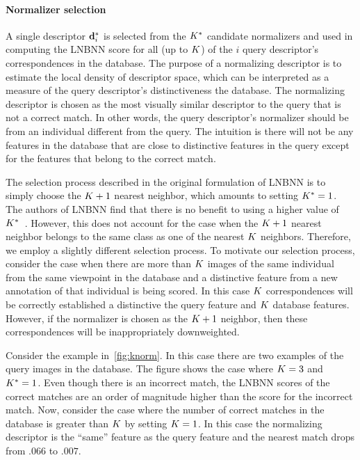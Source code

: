        \paragraph{Normalizer selection}
            A single descriptor $\mathbf{d}^{*}_{i}$ is selected from the $K^{*}{}$ candidate normalizers and used in
              computing the LNBNN score for all (up to $K$) of the $i$\th{} query descriptor's correspondences in
              the database.
            The purpose of a normalizing descriptor is to estimate the local density of descriptor space, which
              can be interpreted as a measure of the query descriptor's distinctiveness \wrt{} the database.
            The normalizing descriptor is chosen as the most visually similar descriptor to the query that is not
              a correct match.
            In other words, the query descriptor's normalizer should be from an individual different from the
              query.
            The intuition is there will not be any features in the database that are close to distinctive
              features in the query except for the features that belong to the correct match.

            The selection process described in the original formulation of LNBNN is to simply choose the $K +
              1$\th{} nearest neighbor, which amounts to setting $K^{*}=1$.
            The authors of LNBNN find that there is no benefit to using a higher value of
              $K^{*}$~\cite{mccann_local_2012}.
            However, this does not account for the case when the $K + 1$\th{} nearest neighbor belongs to the
              same class as one of the nearest $K$ neighbors.
            Therefore, we employ a slightly different selection process.
            To motivate our selection process, consider the case when there are more than $K$ images of the same
              individual from the same viewpoint in the database and a distinctive feature from a new annotation of
              that individual is being scored.
            In this case $K$ correspondences will be correctly established a distinctive the query feature and
              $K$ database features.
            However, if the normalizer is chosen as the $K + 1$ neighbor, then these correspondences will be
              inappropriately downweighted.
              
            Consider the example in~\cref{fig:knorm}.
            In this case there are two examples  of the query images in the database.
            The figure shows the case where $K=3$ and $K^{*}=1$.
            Even though there is an incorrect match, the LNBNN scores of the correct matches are an order of
              magnitude higher than the score for the incorrect match.
            Now, consider the case where the number of correct matches in the database is greater than $K$ by
              setting $K=1$.
            In this case the normalizing descriptor is the ``same'' feature as the query feature and the nearest
              match drops from $.066$ to $.007$.

